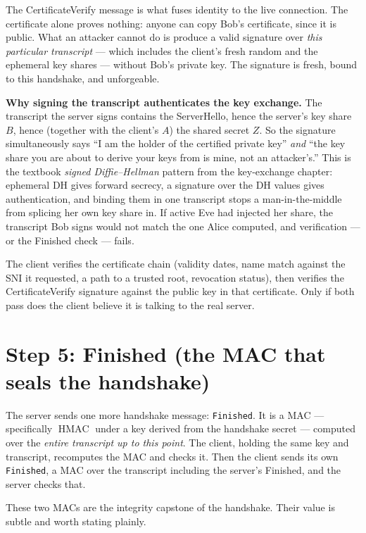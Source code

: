 The CertificateVerify message is what fuses identity to the live connection. The
certificate alone proves nothing: anyone can copy Bob's certificate, since it is
public. What an attacker cannot do is produce a valid signature over
\emph{this particular transcript} --- which includes the client's fresh random and
the ephemeral key shares --- without Bob's private key. The signature is fresh,
bound to this handshake, and unforgeable.

\begin{whybox}
\textbf{Why signing the transcript authenticates the key exchange.} The transcript
the server signs contains the ServerHello, hence the server's key share $B$, hence
(together with the client's $A$) the shared secret $Z$. So the signature
simultaneously says ``I am the holder of the certified private key'' \emph{and}
``the key share you are about to derive your keys from is mine, not an
attacker's.'' This is the textbook \emph{signed Diffie--Hellman} pattern from the
key-exchange chapter: ephemeral DH gives forward secrecy, a signature over the DH
values gives authentication, and binding them in one transcript stops a
man-in-the-middle from splicing her own key share in. If active Eve had injected
her share, the transcript Bob signs would not match the one Alice computed, and
verification --- or the Finished check --- fails.
\end{whybox}

The client verifies the certificate chain (validity dates, name match against the
SNI it requested, a path to a trusted root, revocation status), then verifies the
CertificateVerify signature against the public key in that certificate. Only if
both pass does the client believe it is talking to the real server.

\section{Step 5: Finished (the MAC that seals the handshake)}

The server sends one more handshake message: \texttt{Finished}. It is a MAC ---
specifically $\operatorname{HMAC}$ under a key derived from the handshake secret --- computed over
the \emph{entire transcript up to this point}. The client, holding the same key
and transcript, recomputes the MAC and checks it. Then the client sends its own
\texttt{Finished}, a MAC over the transcript including the server's Finished, and
the server checks that.

These two MACs are the integrity capstone of the handshake. Their value is subtle
and worth stating plainly.

